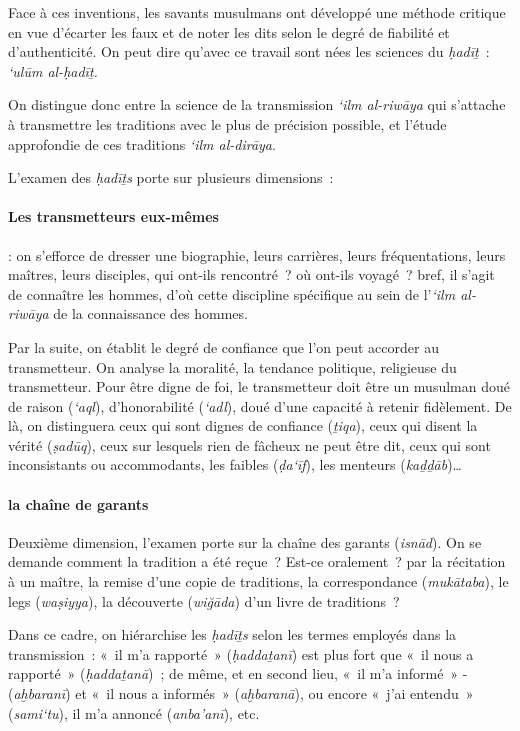 Face à ces inventions, les savants musulmans ont développé une méthode
critique en vue d'écarter les faux et de noter les dits selon le degré
de fiabilité et d'authenticité. On peut dire qu'avec ce travail sont
nées les sciences du \emph{ḥadīṯ}~: \emph{`ulūm al-ḥadīṯ.}

On distingue donc entre la science de la transmission \emph{`ilm
al-riwāya} qui s'attache à transmettre les traditions avec le plus de
précision possible, et l'étude approfondie de ces traditions \emph{`ilm
al-dirāya}.

L'examen des \emph{ḥadīṯs} porte sur plusieurs dimensions~:

 
 \paragraph{Les transmetteurs eux-mêmes~} : on s'efforce de dresser une biographie,
  leurs carrières, leurs fréquentations, leurs maîtres, leurs disciples,
  qui ont-ils rencontré~? où ont-ils voyagé~? bref, il s'agit de
  connaître les hommes, d'où cette discipline spécifique au sein de
  l'\emph{`ilm al-riwāya} de la connaissance des hommes.
 

 
Par la suite, on établit le degré de confiance que l'on peut accorder au
transmetteur. On analyse la moralité, la tendance politique, religieuse
du transmetteur. Pour être digne de foi, le transmetteur doit être un
musulman doué de raison (\emph{`aql}), d'honorabilité (\emph{`adl}),
doué d'une capacité à retenir fidèlement. De là, on distinguera ceux qui
sont dignes de confiance (\emph{ṯiqa}), ceux qui disent la vérité
(\emph{ṣadūq}), ceux sur lesquels rien de fâcheux ne peut être dit, ceux
qui sont inconsistants ou accommodants, les faibles (\emph{ḍa`īf}), les
menteurs (\emph{kaḏḏāb})\ldots{}
 

 \paragraph{la chaîne de garants}
  Deuxième dimension, l'examen porte sur la chaîne des garants
  (\emph{isnād}). On se demande comment la tradition a été reçue~?
  Est-ce oralement~? par la récitation à un maître, la remise d'une
  copie de traditions, la correspondance (\emph{mukātaba}), le legs
  (\emph{waṣiyya}), la découverte (\emph{wiğāda}) d'un livre de
  traditions~?
 
 
Dans ce cadre, on hiérarchise les \emph{ḥadīṯs} selon les termes
employés dans la transmission~: «~il m'a rapporté~» (\emph{ḥaddaṯanī})
est plus fort que «~il nous a rapporté~» (\emph{ḥaddaṯanā})~; de même,
et en second lieu, «~il m'a informé~» -(\emph{aḫbaranī}) et «~il nous a
informés~» (\emph{aḫbaranā}), ou encore «~j'ai entendu~»
(\emph{sami`tu}), il m'a annoncé (\emph{anba'anī}), etc.

